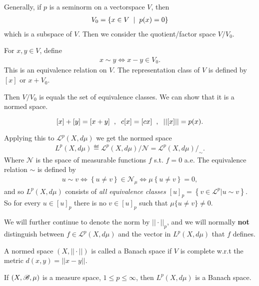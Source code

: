 Generally, if $p$ is a seminorm on a vectorspace $V$, then
 \begin{align}
    V_0 = \left\{x\in V\hspace{2mm}|\hspace{2mm} p(x)=0 \right\}
\end{align}
which is a subspace of $V$. Then we consider the quotient/factor space $V/V_0.$

\begin{definition}
    For $x,y\in V$, define \begin{align}
        x\sim y \iff x-y\in V_0.
    \end{align}
    This is an equivalence relation on $V$. The representation class of $V$ is defined by $[x]$ or $x+V_0$.
\end{definition}

Then $V/V_0$ is equals the set of equivalence classes. We can show that it is a normed space. 

$$[x]+[y]=[x+y]\hspace{2mm},\hspace{2mm} c[x]=[cx]\hspace{2mm},\hspace{2mm} ||[x]||=p(x). $$

Applying this to $\mathcal L^p(X,d\mu)$ we get the normed space \begin{align}
    L^p(X,d\mu) \eqdef \mathcal L ^p(X,d\mu)/\mathcal N = \mathcal{L}^p(X,d\mu)/_{\sim}.
\end{align}
Where $\mathcal N$ is the space of measurable functions $f$ s.t. $f=0$ a.e. The equivalence relation \(\sim\) is defined by 
\begin{align*}
    u\sim v \Longleftrightarrow \left\{u\neq v\right\} \in \mathcal{N}_{\mu} \Longleftrightarrow \mu\left\{u\neq v\right\} = 0,
\end{align*}
and so \(L^p(X,d\mu)\) consists of \emph{all equivalence classes \([u]_p = \left\{v\in\mathcal{L}^p| u\sim v\right\}\).} So for every
\(u\in [u]_p\) there is no \(v\in [u]_p\) such that \(\mu\{u\neq v\} \neq 0\).

We will further continue to denote the norm by 
$||\cdot||_p$, and we will normally \textbf{not} distinguish between $f\in \mathcal L^p(X,d\mu)$ and the vector in 
$L^p(X,d\mu)$ that $f$ defines.

\begin{definition}
    A normed space $(X,||\cdot||)$ is called a Banach space if $V$ is complete w.r.t the metric $d(x,y)=||x-y||$.
\end{definition}

\begin{theorem}
    If $(X,\mathscr{B},\mu)$ is a measure space, $1\leq p\leq \infty$, then $L^p(X,d\mu)$ is a Banach space.
\end{theorem}

